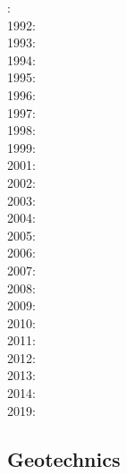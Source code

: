 : \cite{cull60}\\
1992: \cite{befh92}\\
1993: \cite{povp93}\\
1994: \cite{howa94}\cite{koon94}\cite{kobe94}\\
1995: \cite{chmm95}\cite{koon95}\\
1996: \cite{avbu96}\cite{bekh96}\cite{kobe96}\\
1997: \cite{brsa97}\cite{gaft97}\cite{babr97}\\
1998: \cite{deea98}\cite{vabr98}\\
1999: \cite{will99a}\cite{bupi99}\cite{babr99}\cite{tobr99}\\
2001: \cite{zemk01}\cite{tulg01}\cite{brsh01}\cite{bupo01}\cite{coul01}\cite{crda01}\\
2002: \cite{wibr02}\cite{mobr02}\cite{garc02}\cite{whtu02}\\
2003: \cite{brau03}\\
2004: \cite{fijj04}\cite{gocl04}\\
2005: \cite{lave05}\cite{will05}\\
2006: \cite{rosw06}\cite{brau06gsl}\cite{bocr06}\\
2007: \cite{buto07}\cite{sebp07}\cite{tomk07}\\
2008: \cite{alle08}\cite{rowf08}\\
2009: \cite{whip09}\cite{kuhe09}\cite{makh09}\cite{pina09}\cite{dala09}\\
2010: \cite{will10}\cite{tuha10}\cite{brau10b}\cite{brau10}\cite{brya10}\cite{cmwt10}\\
2011: \cite{robr11}\cite{grhd11}\\
2012: \cite{kiwh12}\\
2013: \cite{vehc13}\cite{brwi13}\cite{fihv13a}\cite{fihv13b}\cite{brrs13}\cite{chgz13}\cite{tuva13} \\
2014: \cite{crbr14}\cite{cokm14}\cite{erhv14}\cite{erhv15} \\
2019: \cite{anpa19}

\subsection*{Geotechnics}

\noindent
\cite{ster99}
\cite{gora03}
\cite{zhll03}
\cite{gour04}
\cite{gork06}
\cite{bufy14}

